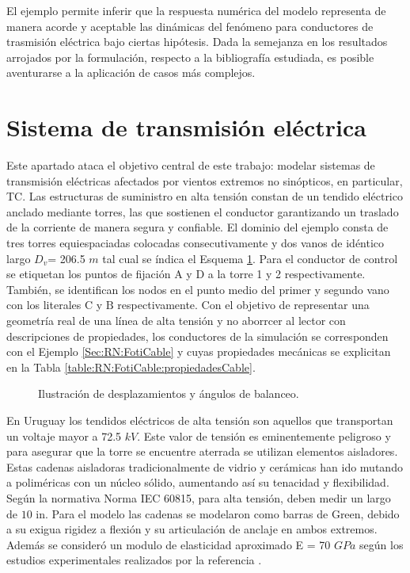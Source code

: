 El ejemplo permite inferir que la respuesta numérica del modelo representa de manera acorde y aceptable las dinámicas del fenómeno para conductores de trasmisión eléctrica bajo ciertas hipótesis. Dada la semejanza en los resultados arrojados por la formulación, respecto a la bibliografía estudiada, es posible aventurarse a la aplicación de casos más complejos. 



\section{Sistema de transmisión eléctrica }\label{Sec:RN:TransmissionSystem}
Este apartado ataca el objetivo central de este trabajo: modelar sistemas de transmisión eléctricas afectados por vientos extremos no sinópticos, en particular, TC. Las estructuras de suministro en alta tensión constan de un tendido eléctrico anclado mediante torres, las que sostienen el conductor garantizando un traslado de la corriente de manera segura y confiable. El dominio del ejemplo consta de tres torres equiespaciadas colocadas consecutivamente y dos vanos de idéntico largo $D_v$= 206.5 $m$ tal cual se índica el Esquema \ref{fig:Transmission:EsquemaGeneral}.  Para el conductor de control se etiquetan los puntos de fijación $\text{A}$ y $\text{D}$ a la torre 1 y 2 respectivamente. También, se identifican los nodos en el punto medio del primer y segundo vano con los literales $\text{C}$ y $\text{B}$ respectivamente. Con el objetivo de representar una geometría real de una línea de alta tensión y no aborrcer al lector con descripciones de propiedades, los conductores de la simulación se corresponden con el Ejemplo \ref{Sec:RN:FotiCable} y cuyas propiedades mecánicas se explicitan en la Tabla \ref{table:RN:FotiCable:propiedadesCable}.  


\begin{figure}[htbp]
	\centering
	\def\svgwidth{120mm}
	
	\caption{Ilustración de desplazamientos y ángulos de balanceo.}
	\label{fig:Transmission:EsquemaGeneral}
\end{figure}

 En Uruguay los tendidos eléctricos de alta tensión son aquellos que transportan un voltaje mayor a 72.5 $kV$. Este valor de tensión es eminentemente peligroso y para asegurar que la torre se encuentre aterrada se utilizan elementos aisladores. Estas cadenas aisladoras tradicionalmente de vidrio y cerámicas han ido mutando a poliméricas con un núcleo sólido, aumentando así su tenacidad y flexibilidad. Según la normativa Norma IEC 60815, para alta tensión, deben medir un largo de $10$ in. Para el modelo las cadenas se modelaron como barras de Green, debido a su exigua rigidez a flexión y su articulación de anclaje en ambos extremos. Además se consideró un modulo de elasticidad aproximado E = 70 $GPa$ según los estudios experimentales realizados por la referencia \cite{MoralesAisladores}.


